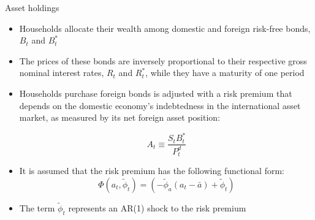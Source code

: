 \documentclass[9pt]{beamer}
\begin{document}
\begin{frame}{Asset holdings}
\begin{itemize}

    \item  Households allocate their wealth among domestic and foreign risk-free bonds, $B_t$ and $B_t^{*}$
    
    \item The prices of these bonds are inversely proportional to their respective gross nominal interest rates, $R_t$ and $R_t^{*}$, while they have a maturity of one period
    
    \item Households purchase foreign bonds is adjusted with a risk premium that depends on the domestic economy’s indebtedness in the international asset market, as measured by its net foreign asset position:
    
    $$A_{t} \equiv \frac{S_{t} B_{t}^{*}}{P_{t}^{d}}$$
    
    \item It is assumed that the risk premium has the following functional form: $$\Phi(a_t,\tilde{\phi}_t) =
    \left(-\widetilde{\phi}_{a}\left(a_{t}-\bar{a}\right)+\tilde{\phi}_{t}\right) $$ 
    
    \item The term $\tilde{\phi}_{t}$ represents an AR(1) shock to the risk premium
    
\end{itemize}

\end{frame}
\end{document}
